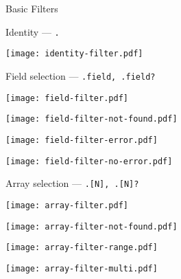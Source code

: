 \documentclass{beamer}
\renewcommand\big[1]{
  \begin{center}
    \Large{#1}
  \end{center}
}
\begin{document}
\begin{frame}
  \centering\Huge{Basic Filters}
\end{frame}

\begin{frame}[fragile]
  \big{Identity --- \texttt{.}}
  \begin{center}
    \texttt{[image: identity-filter.pdf]}
  \end{center}
\end{frame}

\begin{frame}[fragile]
  \big{Field selection --- \texttt{.field, .field?}}
  \begin{center}
    \begin{minipage}{.24\textwidth}
      \texttt{[image: field-filter.pdf]}
    \end{minipage}
    \begin{minipage}{.24\textwidth}
      \texttt{[image: field-filter-not-found.pdf]}
    \end{minipage}
    \begin{minipage}{.24\textwidth}
      \texttt{[image: field-filter-error.pdf]}
    \end{minipage}
    \begin{minipage}{.24\textwidth}
      \texttt{[image: field-filter-no-error.pdf]}
    \end{minipage}
  \end{center}
\end{frame}

\begin{frame}[fragile]
  \big{Array selection --- \texttt{.[N], .[N]?}}
  \begin{center}
    \begin{minipage}{.24\textwidth}
      \texttt{[image: array-filter.pdf]}
    \end{minipage}
    \begin{minipage}{.24\textwidth}
      \texttt{[image: array-filter-not-found.pdf]}
    \end{minipage}
    \begin{minipage}{.24\textwidth}
      \texttt{[image: array-filter-range.pdf]}
    \end{minipage}
    \begin{minipage}{.24\textwidth}
      \texttt{[image: array-filter-multi.pdf]}
    \end{minipage}
  \end{center}
\end{frame}
\end{document}
